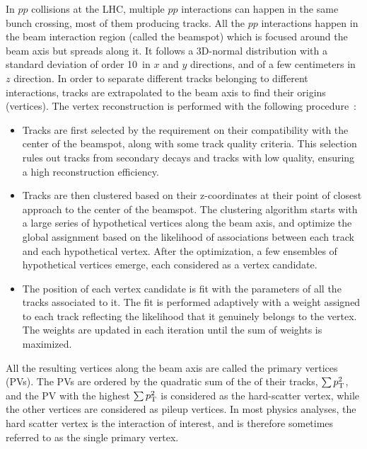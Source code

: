 In $pp$ collisions at the LHC, multiple $pp$ interactions can happen in the same bunch crossing,
most of them producing tracks.
All the $pp$ interactions happen in the beam interaction region (called the beamspot) 
which is focused around the beam axis but spreads along it.
It follows a 3D-normal distribution with a standard deviation of order 10~\mum in $x$ and $y$ directions,
and of a few centimeters in $z$ direction.
In order to separate different tracks belonging to different interactions, 
tracks are extrapolated to the beam axis to find their origins (vertices).
The vertex reconstruction is performed with the following procedure~\cite{Collaboration_2014}:
\begin{itemize}
\item Tracks are first selected by the requirement on their compatibility with the center of the beamspot, 
      along with some track quality criteria.
      This selection rules out tracks from secondary decays and tracks with low quality, 
      ensuring a high reconstruction efficiency. 
\item Tracks are then clustered based on their z-coordinates at their point of closest approach to the center of the beamspot.
      The clustering algorithm starts with a large series of hypothetical vertices along the beam axis, 
      and optimize the global assignment based on the likelihood of associations between each track and each hypothetical vertex.
      After the optimization, a few ensembles of hypothetical vertices emerge, each considered as a vertex candidate.
\item The position of each vertex candidate is fit with the parameters of all the tracks associated to it.
      The fit is performed adaptively with a weight assigned to each track reflecting the likelihood that it genuinely belongs to the vertex.
      The weights are updated in each iteration until the sum of weights is maximized. 
\end{itemize}

All the resulting vertices along the beam axis are called the primary vertices (PVs).
The PVs are ordered by the quadratic sum of the \pt of their tracks, $\sum p_{\mathrm{T}}^{2}$,
and the PV with the highest $\sum p_{\mathrm{T}}^{2}$ is considered as the hard-scatter vertex, 
while the other vertices are considered as pileup vertices.
In most physics analyses, the hard scatter vertex is the interaction of interest,
and is therefore sometimes referred to as the single primary vertex.


